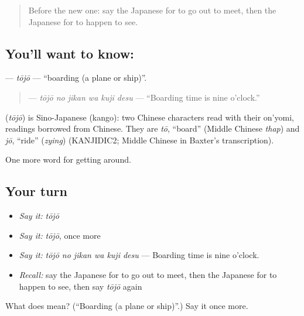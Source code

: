 \label{lesson:JA-C387-toujou}



\begin{quote}
Before the new one: say the Japanese for to go out to meet, then the Japanese for to happen to see.
\end{quote}

\subsection*{You'll want to know: }
\textbf{} — \emph{tōjō} — \textquotedblleft{}boarding (a plane or ship)\textquotedblright{}.

\begin{quote}
\textbf{  } — \emph{tōjō no jikan wa kuji desu} — \textquotedblleft{}Boarding time is nine o'clock.\textquotedblright{}
\end{quote}

\begin{cousinweb}
\textbf{} (\emph{tōjō}) is Sino-Japanese (kango): two Chinese characters read with their on'yomi, readings borrowed from Chinese. They are \emph{tō}, \textquotedblleft{}board\textquotedblright{} (Middle Chinese \emph{thap}) and \emph{jō}, \textquotedblleft{}ride\textquotedblright{} (\emph{zying}) (KANJIDIC2; Middle Chinese in Baxter's transcription).
\end{cousinweb}

\begin{grammarlens}[title={What you've built}]
One more word for getting around.
\end{grammarlens}

\subsection*{Your turn}
\begin{itemize}
\raggedright
  \item \emph{Say it:} \emph{tōjō}
  \item \emph{Say it:} \emph{tōjō}, once more
  \item \emph{Say it:} \emph{tōjō no jikan wa kuji desu} — Boarding time is nine o'clock.
  \item \emph{Recall:} say the Japanese for to go out to meet, then the Japanese for to happen to see, then say \emph{tōjō} again
\end{itemize}

\begin{tcolorbox}[breakable,colback=teal!4,colframe=teal!35!black,title={Before you move on}]
What does  mean? (\textquotedblleft{}Boarding (a plane or ship)\textquotedblright{}.) Say it once more.
\end{tcolorbox}

